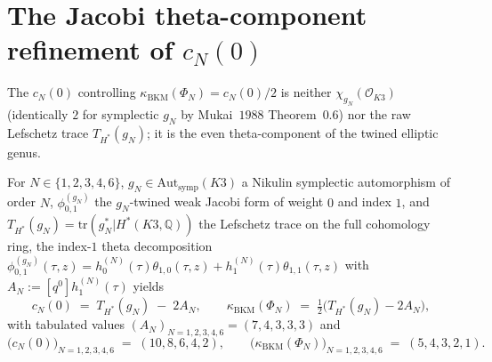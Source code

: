 \section{The Jacobi theta-component refinement of \texorpdfstring{$c_N(0)$}{c-N(0)}}
\label{sec:k3e-jacobi-theta-refinement}

The $c_N(0)$ controlling $\kappa_{\mathrm{BKM}}(\Phi_N) = c_N(0)/2$ is neither $\chi_{g_N}(\mathcal{O}_{K3})$ (identically $2$ for symplectic $g_N$ by Mukai~$1988$ Theorem~$0.6$) nor the raw Lefschetz trace $T_{H^*}(g_N)$; it is the even theta-component of the twined elliptic genus.

\begin{theorem}
\label{thm:k3e-jacobi-theta-refinement}
For $N \in \{1, 2, 3, 4, 6\}$, $g_N \in \mathrm{Aut}_{\mathrm{symp}}(K3)$ a Nikulin symplectic automorphism of order $N$, $\phi^{(g_N)}_{0, 1}$ the $g_N$-twined weak Jacobi form of weight $0$ and index $1$, and $T_{H^*}(g_N) = \mathrm{tr}(g_N^* | H^*(K3, \mathbb{Q}))$ the Lefschetz trace on the full cohomology ring, the index-$1$ theta decomposition $\phi^{(g_N)}_{0, 1}(\tau, z) = h^{(N)}_0(\tau) \theta_{1, 0}(\tau, z) + h^{(N)}_1(\tau) \theta_{1, 1}(\tau, z)$ with $A_N := [q^0] h^{(N)}_1(\tau)$ yields
\begin{equation}
\label{eq:k3e-jacobi-theta-refinement}
c_N(0) \;=\; T_{H^*}(g_N) \;-\; 2 A_N, \qquad \kappa_{\mathrm{BKM}}(\Phi_N) \;=\; \tfrac{1}{2}\bigl(T_{H^*}(g_N) - 2 A_N\bigr),
\end{equation}
with tabulated values $(A_N)_{N = 1, 2, 3, 4, 6} = (7, 4, 3, 3, 3)$ and
\[
\bigl(c_N(0)\bigr)_{N = 1, 2, 3, 4, 6} \;=\; (10, 8, 6, 4, 2), \qquad \bigl(\kappa_{\mathrm{BKM}}(\Phi_N)\bigr)_{N = 1, 2, 3, 4, 6} \;=\; (5, 4, 3, 2, 1).
\]
\end{theorem}

